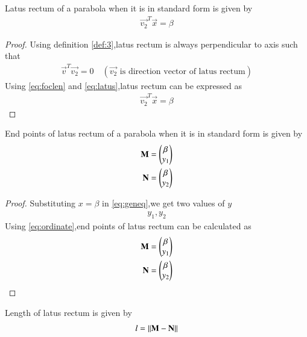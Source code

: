 \documentclass[journal,12pt,twocolumn]{IEEEtran}
\begin{document}
\begin{lemma}
Latus rectum of a parabola when it is in standard form is given by 
\begin{align}
    \vec{v_2}^T\vec{x} = \beta 
\end{align}
\end{lemma}

\begin{proof}
Using definition \ref{def:3},latus rectum is always perpendicular to axis such that
\begin{align}
    \vec{v}^T\vec{v_2} = 0 \quad (\text{$\vec{v_2}$ is direction vector of latus rectum}) \label{eq:latus}
\end{align}
Using \eqref{eq:foclen} and \eqref{eq:latus},latus rectum can be expressed as 
\begin{align}
    \vec{v_2}^T\vec{x} = \beta 
\end{align}
\end{proof}

\begin{lemma}
End points of latus rectum of a parabola when it is in standard form is given by
\begin{align}
    \mathbf{M}&=\begin{pmatrix}\beta \\ y_1\end{pmatrix} 
    \\
    \mathbf{N}&=\begin{pmatrix}\beta \\ y_2\end{pmatrix} 
\end{align}
\end{lemma}

\begin{proof}
Substituting $x=\beta$ in \eqref{eq:geneq},we get two values of $y$
\begin{align}
    y_1 , y_2 \label{eq:ordinate}
\end{align}
Using \eqref{eq:ordinate},end points of latus rectum can be calculated as
\begin{align}
    \mathbf{M}&=\begin{pmatrix}\beta \\ y_1\end{pmatrix} \label{eq:endpt1}
    \\
    \mathbf{N}&=\begin{pmatrix}\beta \\ y_2\end{pmatrix} \label{eq:endpt2}
\end{align}
\end{proof}

\begin{lemma}
Length of latus rectum is given by 
\begin{align}
    l=\left\lVert\mathbf{M}-\mathbf{N}\right\rVert
\end{align}
\end{lemma}
\end{document}
